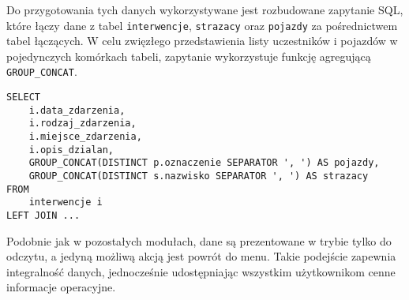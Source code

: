 Do przygotowania tych danych wykorzystywane jest rozbudowane zapytanie SQL, które łączy dane z tabel \texttt{interwencje}, \texttt{strazacy} oraz \texttt{pojazdy} za pośrednictwem tabel łączących. W celu zwięzłego przedstawienia listy uczestników i pojazdów w pojedynczych komórkach tabeli, zapytanie wykorzystuje funkcję agregującą \texttt{GROUP\_CONCAT}.

\begin{lstlisting}[style=sqlStyle, caption={Fragment zapytania SQL agregującego dane dla widoku interwencji.}, label={lst:group_concat}]
SELECT
    i.data_zdarzenia,
    i.rodzaj_zdarzenia,
    i.miejsce_zdarzenia,
    i.opis_dzialan,
    GROUP_CONCAT(DISTINCT p.oznaczenie SEPARATOR ', ') AS pojazdy,
    GROUP_CONCAT(DISTINCT s.nazwisko SEPARATOR ', ') AS strazacy
FROM
    interwencje i
LEFT JOIN ...
\end{lstlisting}

Podobnie jak w pozostałych modułach, dane są prezentowane w trybie tylko do odczytu, a jedyną możliwą akcją jest powrót do menu. Takie podejście zapewnia integralność danych, jednocześnie udostępniając wszystkim użytkownikom cenne informacje operacyjne.
